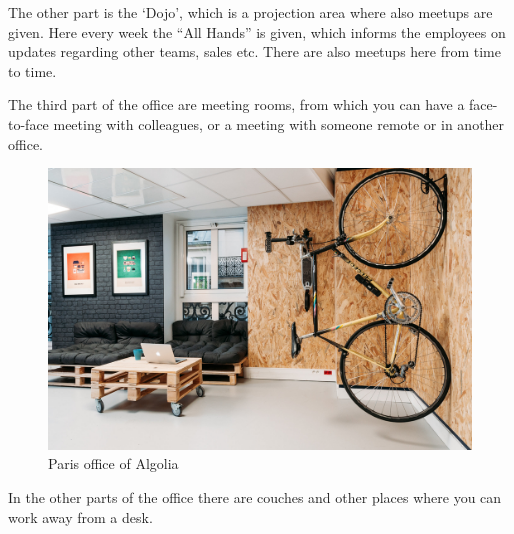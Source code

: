 The other part is the `Dojo', which is a projection area where also meetups are given. Here every week the ``All Hands'' is given, which informs the employees on updates regarding other teams, sales etc. There are also meetups here from time to time.

The third part of the office are meeting rooms, from which you can have a face-to-face meeting with colleagues, or a meeting with someone remote or in another office.

\begin{figure}[H]
\label{figure:algolia-office}
  \centering
  \includegraphics[width=\textwidth]{../assets/officelovin.jpg}
  \caption{Paris office of Algolia~\cite{officelovin}}
\end{figure}

In the other parts of the office there are couches and other places where you can work away from a desk.

